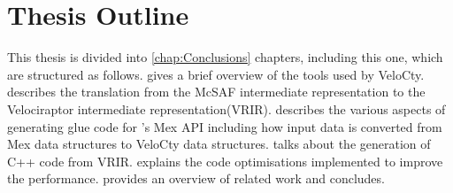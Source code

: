 \section{Thesis Outline}
This thesis is divided into \ref{chap:Conclusions} chapters, including this one, which are structured as follows.
 gives a brief overview of the tools
used by VeloCty.
 describes the translation from the McSAF  
intermediate representation to the Velociraptor intermediate representation(VRIR).
 describes the various aspects of generating glue code for \matlab's Mex API including how input data is converted from Mex data structures to VeloCty data structures. 
 talks about the generation of C++ code from VRIR.
 explains the code optimisations implemented to improve the performance. 
 provides an overview of related work and
 concludes.
